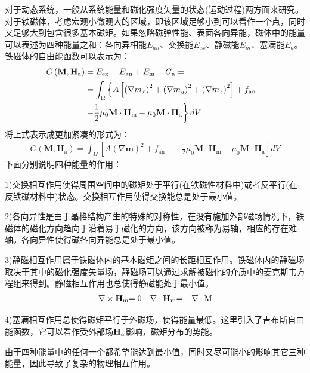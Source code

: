 	对于动态系统，一般从系统能量和磁化强度矢量的状态(运动过程)两方面来研究。对于铁磁体，考虑宏观小微观大的区域，即该区域足够小到可以看作一个点，同时又足够大到包含很多基本磁矩。如果忽略磁弹性能、表面各向异能，磁体中的能量可以表述为四种能量之和：各向异相能$ E_{an} $、交换能$ E_{ex} $、静磁能$ E_m $、塞满能$ E_a $。铁磁体的自由能函数可以表示为：
	\begin{align}
		G\left(\mathbf{M}, \mathbf{H}_{\mathrm{a}}\right) &=E_{\mathrm{ex}}+E_{\mathrm{an}}+E_{\mathrm{m}}+G_{\mathrm{a}}= \notag \\  
		&=\int_{\Omega}\left\{A\left[\left(\nabla m_{x}\right)^{2}+\left(\nabla m_{y}\right)^{2}+\left(\nabla m_{z}\right)^{2}\right]+f_{\mathrm{an}}+\right.  \notag \\
		&\left.-\frac{1}{2} \mu_{0} \mathbf{M} \cdot \mathbf{H}_{\mathrm{m}}-\mu_{0} \mathbf{M} \cdot \mathbf{H}_{\mathrm{a}}\right\} d V   \label{eq:1.1}
	\end{align} 
	将上式表示成更加紧凑的形式为：
	\begin{align}
	G\left(\mathbf{M}, \mathbf{H}_{\mathrm{a}}\right)=\int_{\Omega}\left[A(\nabla \mathbf{m})^{2}+f_{\mathrm{an}}+-\frac{1}{2} \mu_{0} \mathbf{M} \cdot \mathbf{H}_{\mathrm{m}}-\mu_{0} \mathbf{M} \cdot \mathbf{H}_{\mathrm{a}}\right] d V \label{eq:1.2}
	\end{align} 
	下面分别说明四种能量的作用：
	
	1)交换相互作用使得周围空间中的磁矩处于平行(在铁磁性材料中)或者反平行(在反铁磁材料中)状态。交换相互作用使得交换能总是处于最小值。
	
	2)各向异性是由于晶格结构产生的特殊的对称性，在没有施加外部磁场情况下，铁磁体的磁化方向趋向于沿着易于磁化的方向，该方向被称为易轴，相应的存在难轴。各向异性使得磁各向异能总是处于最小值。
	
	3)静磁相互作用属于铁磁体内的基本磁矩之间的长距相互作用。铁磁体内的静磁场取决于其中的磁化强度矢量场，静磁场可以通过求解被磁化的介质中的麦克斯韦方程组来得到。静磁相互作用也总使得静磁能处于最小值。
	\begin{align}
	\nabla  \times {{\bf{H}}_{\rm{m}}}{\rm{ = 0}} && \nabla  \cdot {{\bf{H}}_{\rm{m}}}{\rm{ =  - }}\nabla  \cdot {\rm{M}} \label{eq:1.3}
	\end{align}
	
	4)塞满相互作用总使得磁矩平行于外磁场，使得能量最低。这里引入了吉布斯自由能函数，它可以看作受外部场$ {{\bf{H}}_a} $影响，磁矩分布的势能。	
	
	由于四种能量中的任何一个都希望能达到最小值，同时又尽可能小的影响其它三种能量，因此导致了复杂的物理相互作用。
	
